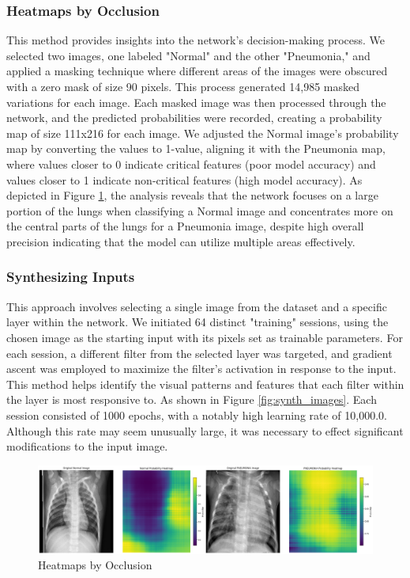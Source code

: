 \documentclass{article}
\begin{document}
\subsubsection{Heatmaps by Occlusion}
This method provides insights into the network's decision-making process. We selected two images, one labeled "Normal" and the other "Pneumonia," and applied a masking technique where different areas of the images were obscured with a zero mask of size 90 pixels. This process generated 14,985 masked variations for each image. Each masked image was then processed through the network, and the predicted probabilities were recorded, creating a probability map of size 111x216 for each image. We adjusted the Normal image's probability map by converting the values to 1-value, aligning it with the Pneumonia map, where values closer to 0 indicate critical features (poor model accuracy) and values closer to 1 indicate non-critical features (high model accuracy). As depicted in Figure \ref{fig:occlusion}, the analysis reveals that the network focuses on a large portion of the lungs when classifying a Normal image and concentrates more on the central parts of the lungs for a Pneumonia image, despite high overall precision indicating that the model can utilize multiple areas effectively.

\subsubsection{Synthesizing Inputs}
This approach involves selecting a single image from the dataset and a specific layer within the network. We initiated 64 distinct "training" sessions, using the chosen image as the starting input with its pixels set as trainable parameters. For each session, a different filter from the selected layer was targeted, and gradient ascent was employed to maximize the filter's activation in response to the input. This method helps identify the visual patterns and features that each filter within the layer is most responsive to. As shown in Figure \ref{fig:synth_images}. Each session consisted of 1000 epochs, with a notably high learning rate of 10,000.0. Although this rate may seem unusually large, it was necessary to effect significant modifications to the input image.


\begin{figure}[H]
  \centering
  \includegraphics[width=0.95\linewidth, angle=0]{occlusion.png}
  \caption{Heatmaps by Occlusion}
  \label{fig:occlusion}
\end{figure}
\end{document}
